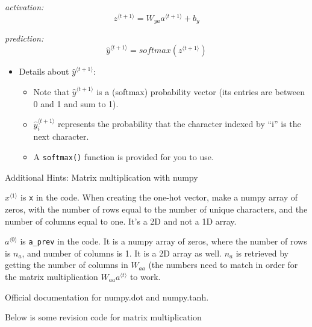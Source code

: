 \documentclass[11pt]{article}
\providecommand{\tightlist}{%
      \setlength{\itemsep}{0pt}\setlength{\parskip}{0pt}}
\begin{document}
\emph{activation:}
\[ z^{\langle t + 1 \rangle } = W_{ya}  a^{\langle t + 1 \rangle } + b_y \tag{2}\]

\emph{prediction:}
\[ \hat{y}^{\langle t+1 \rangle } = softmax(z^{\langle t + 1 \rangle })\tag{3}\]

\begin{itemize}
\tightlist
\item
  Details about \(\hat{y}^{\langle t+1 \rangle }\):

  \begin{itemize}
  \tightlist
  \item
    Note that \(\hat{y}^{\langle t+1 \rangle }\) is a (softmax)
    probability vector (its entries are between 0 and 1 and sum to 1).
  \item
    \(\hat{y}^{\langle t+1 \rangle}_i\) represents the probability that
    the character indexed by ``i'' is the next character.\\
  \item
    A \texttt{softmax()} function is provided for you to use.
  \end{itemize}
\end{itemize}

    Additional Hints: Matrix multiplication with numpy

\(x^{\langle 1 \rangle}\) is \texttt{x} in the code. When creating the
one-hot vector, make a numpy array of zeros, with the number of rows
equal to the number of unique characters, and the number of columns
equal to one. It's a 2D and not a 1D array.

\(a^{\langle 0 \rangle}\) is \texttt{a\_prev} in the code. It is a numpy
array of zeros, where the number of rows is \(n_{a}\), and number of
columns is 1. It is a 2D array as well. \(n_{a}\) is retrieved by
getting the number of columns in \(W_{aa}\) (the numbers need to match
in order for the matrix multiplication \(W_{aa}a^{\langle t \rangle}\)
to work.

Official documentation for numpy.dot and numpy.tanh.

Below is some revision code for matrix multiplication
\end{document}
